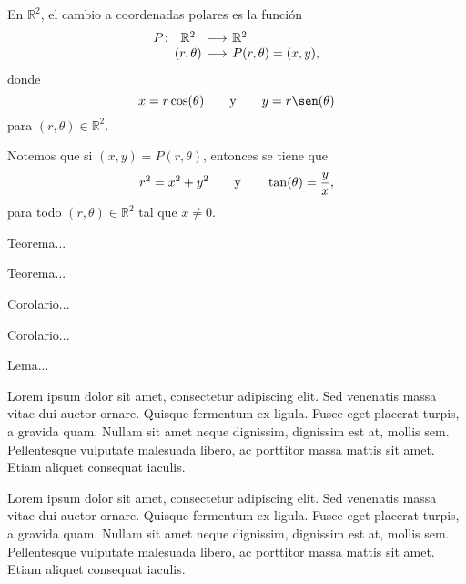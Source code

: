 \documentclass[a4]{aleph-notas}
\begin{document}
\begin{defi}
    En $\mathbb{R}^2$, el cambio a coordenadas polares es la función
    \[
        \funcion{P}{\mathbb{R}^2}{\mathbb{R}^2}
        {(r,\theta)}{P(r , \theta)=(x,y),}
    \]
    donde
    \[
        x= r\cos(\theta)
        \texty
        y= r\sen(\theta)
    \]
    para $(r,\theta)\in \mathbb{R}^2$.
\end{defi}

\begin{advertencia}
    Notemos que si $(x,y)=P(r,\theta)$, entonces se tiene que
    \[
        r^2=x^2+y^2
        \qquad\text{y}\qquad
        \tan(\theta)=\frac y x,
    \]  
    para todo $(r,\theta)\in\mathbb{R}^2$ tal que $x\neq 0$.
\end{advertencia}

\begin{teo}
    Teorema...
\end{teo}

\begin{teo}
    Teorema...
\end{teo}

\begin{cor}
    Corolario...
\end{cor}

\begin{cor}[Título]
    Corolario...
\end{cor}

\begin{lem}
    Lema...
\end{lem}

\begin{obs}
    Lorem ipsum dolor sit amet, consectetur adipiscing elit. Sed venenatis massa vitae dui auctor ornare. Quisque fermentum ex ligula. Fusce eget placerat turpis, a gravida quam. Nullam sit amet neque dignissim, dignissim est at, mollis sem. Pellentesque vulputate malesuada libero, ac porttitor massa mattis sit amet. Etiam aliquet consequat iaculis.
\end{obs}

\begin{ejem}
    Lorem ipsum dolor sit amet, consectetur adipiscing elit. Sed venenatis massa vitae dui auctor ornare. Quisque fermentum ex ligula. Fusce eget placerat turpis, a gravida quam. Nullam sit amet neque dignissim, dignissim est at, mollis sem. Pellentesque vulputate malesuada libero, ac porttitor massa mattis sit amet. Etiam aliquet consequat iaculis.
\end{ejem}
\end{document}
